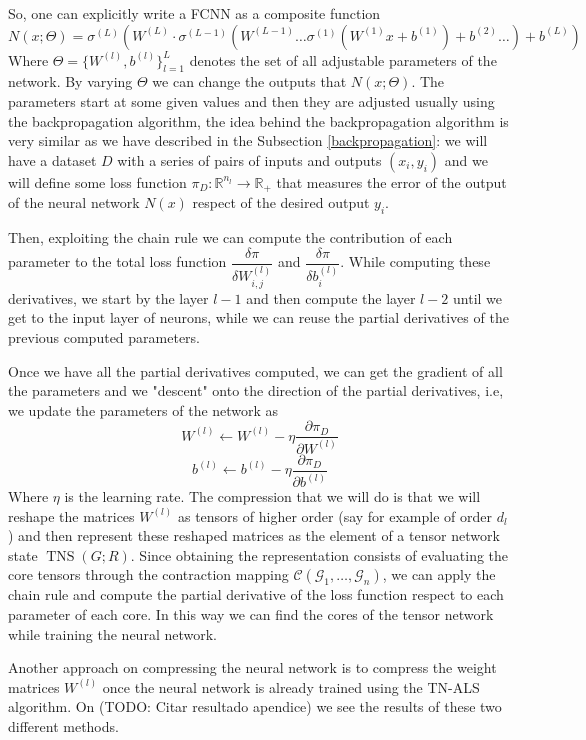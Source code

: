 \documentclass[11pt,a4paper,openright,oneside]{book}
\numberwithin{equation}{section}
\DeclareMathOperator{\TNS}{TNS}
\begin{document}
{So, one can explicitly write a \gls{FCNN} as a composite function
$$N(x; \Theta) = \sigma^{(L)}(W^{(L)} \cdot \sigma^{(L - 1)}( W^{(L-1)} \dots \sigma^{(1)}(W^{(1)} x + b^{(1)}) + b^{(2)} \dots ) + b^{(L)})$$
Where $\Theta = \{W^{(l)}, b^{(l)}\}_{l=1}^L$ denotes the set of all adjustable parameters of the network.
By varying $\Theta$ we can change the outputs that $N(x; \Theta)$. The
parameters start at some given values and then they are adjusted usually using the backpropagation algorithm, the idea behind the backpropagation
algorithm is very similar as we have  
described in the Subsection \ref{backpropagation}: we will have a dataset $D$ with a series of pairs of inputs and outputs $(x_i, y_i)$ and we
will define some loss function $\pi_D : \mathbb{R}^{n_l} \rightarrow \mathbb{R}_+$ that measures the error of the output of the neural network $N(x)$ respect of the desired output $y_i$.

Then, exploiting the chain rule we can compute the contribution of each parameter to the total loss function $\dfrac{\delta \pi}{\delta W^{(l)}_{i, j}}$
and $\dfrac{\delta \pi}{\delta b^{(l)}_i}$. While computing these derivatives, we start by the layer $l-1$ and then
compute the layer $l-2$ until we get to the input layer of neurons, while we can reuse the partial derivatives of the previous
computed parameters.

Once we have all the partial derivatives computed, we can get the gradient of all the parameters and we "descent" onto the direction of
the partial derivatives, i.e, we update the parameters of the network as
$$W^{(l)} \leftarrow W^{(l)} - \eta \frac{\partial \pi_D}{\partial W^{(l)}}$$
$$b^{(l)} \leftarrow b^{(l)} - \eta \frac{\partial \pi_D}{\partial b^{(l)}}$$
Where $\eta$ is the learning rate. The compression that we will do is that we will reshape the matrices $W^{(l)}$ as tensors
of higher order (say for example of order $d_l$) and then represent these reshaped matrices as the element of a tensor network state
$\TNS(G; R)$. Since obtaining the representation consists of evaluating the core tensors through the contraction
mapping $\mathcal{C}(\mathcal{G}_1, \dots, \mathcal{G}_n)$, we can apply the chain rule and compute the partial derivative of the
loss function respect to each parameter of each core. In this way we can find the cores of the tensor network while training the neural network.



Another approach on compressing the neural network is to compress the weight matrices $W^{(l)}$ once the neural network is already trained using the
TN-ALS algorithm. On (TODO: Citar resultado apendice) we see the results of these two different methods.



}
\end{document}
